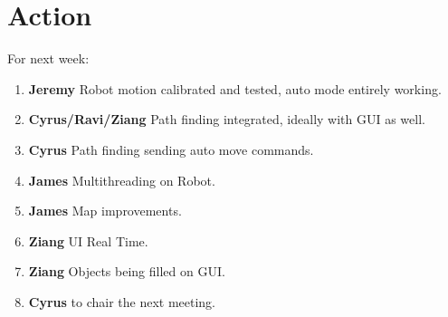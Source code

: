 \documentclass{article}
\begin{document}
\section{Action}
For next week:
\begin{enumerate}
\item \textbf{Jeremy} Robot motion calibrated and tested, auto mode entirely working.
\item \textbf{Cyrus/Ravi/Ziang} Path finding integrated, ideally with GUI as well.
\item \textbf{Cyrus} Path finding sending auto move commands.
\item \textbf{James} Multithreading on Robot.
\item \textbf{James} Map improvements.
\item \textbf{Ziang} UI Real Time.
\item \textbf{Ziang} Objects being filled on GUI.
\item \textbf{Cyrus} to chair the next meeting.
\end{enumerate}
\end{document}
